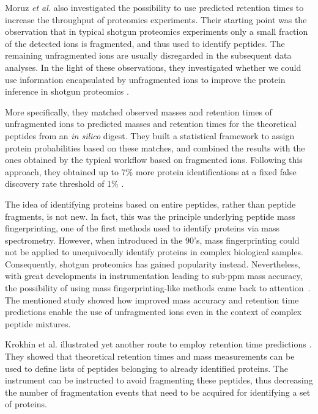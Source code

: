 \documentclass[a4paper]{article}
\begin{document}
Moruz {\em et al.} also investigated the possibility to use predicted
retention times to increase the throughput of proteomics
experiments. Their starting point was the observation that in typical
shotgun proteomics experiments only a small fraction of the detected
ions is fragmented, and thus used to identify peptides. The remaining
unfragmented ions are usually disregarded in the subsequent data
analyses. In the light of these observations, they investigated
whether we could use information encapsulated by unfragmented ions to
improve the protein inference in shotgun proteomics \cite{mf}.



More specifically, they matched observed masses and retention times of
unfragmented ions to predicted masses and retention times for the
theoretical peptides from an {\it in silico} digest. They built a
statistical framework to assign protein probabilities based on these
matches, and combined the results with the ones obtained by the
typical workflow based on fragmented ions. Following this approach, they
obtained up to 7\% more protein identifications at a fixed false
discovery rate threshold of 1\% \cite{mf}.

The idea of identifying proteins based on entire peptides, rather than
peptide fragments, is not new. In fact, this was the principle
underlying peptide mass fingerprinting, one of the first methods used
to identify proteins via mass spectrometry. However, when introduced
in the 90's, mass fingerprinting could not be applied to unequivocally
identify proteins in complex biological samples. Consequently, shotgun
proteomics has gained popularity instead. Nevertheless, with great
developments in instrumentation leading to sub-ppm mass accuracy, the
possibility of using mass fingerprinting-like methods came back to
attention~\cite{iamt1}. The mentioned study showed how improved mass
accuracy and retention time predictions enable the use of unfragmented
ions even in the context of complex peptide mixtures.

Krokhin et al. illustrated yet another route to employ retention time
predictions \cite{krokhin200612, McQueen2012}. They showed that
theoretical retention times and mass measurements can be used to
define lists of peptides belonging to already identified proteins. The
instrument can be instructed to avoid fragmenting these peptides, thus
decreasing the number of fragmentation events that need to be acquired
for identifying a set of proteins.
\end{document}

